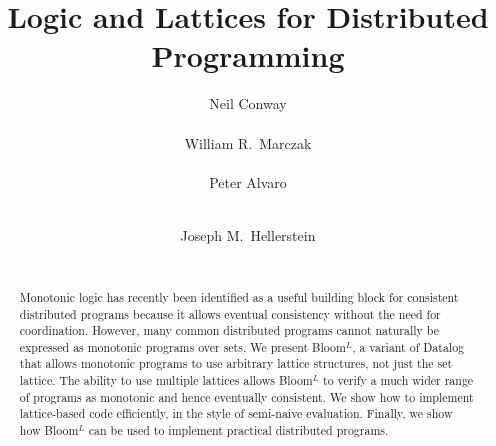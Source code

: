 \documentclass{vldb}
\def\lang{Bloom$^L$\xspace}
\begin{document}
\title{Logic and Lattices for Distributed Programming}


\author{
\alignauthor
Neil Conway\\
       \\
\alignauthor
William R.\ Marczak\\
       \\
\alignauthor
Peter Alvaro\\
       \\
\and
\alignauthor
Joseph M.\ Hellerstein\\
       \\
}

\maketitle

\begin{abstract}
  Monotonic logic has recently been identified as a useful building block for
  consistent distributed programs because it allows eventual consistency without
  the need for coordination. However, many common distributed programs cannot
  naturally be expressed as monotonic programs over sets. We present \lang, a
  variant of Datalog that allows monotonic programs to use arbitrary lattice
  structures, not just the set lattice. The ability to use multiple lattices
  allows \lang to verify a much wider range of programs as monotonic and hence
  eventually consistent.  We show how to implement lattice-based code
  efficiently, in the style of semi-naive evaluation. Finally, we show how \lang
  can be used to implement practical distributed programs.
\end{abstract}










%

\balance
\begin{small}


\end{small}

% 
\end{document}
